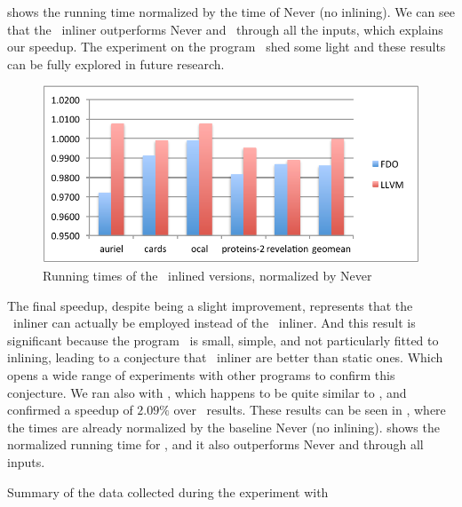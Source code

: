  shows the running time normalized by the time of Never (no inlining). We can see that the \FDI\ inliner outperforms Never and \llvm\ through all the inputs, which explains our speedup. The experiment on the program \bzip\ shed some light and these results can be fully explored in future research.

\begin{figure}
  \centering
  \includegraphics[width=1.00\linewidth]{Figures/speedupb}
  \caption{Running times of the \bzip\ inlined versions, normalized by Never}
  \label{fig:speedup}
\end{figure}

The final speedup, despite being a slight improvement, represents that the \FDI\ inliner can actually be employed instead of the \llvm\ inliner. And this result is significant because the program \bzip\ is small, simple, and not particularly fitted to inlining, leading to a conjecture that \FDI\ inliner are better than static ones. Which opens a wide range of experiments with other programs to confirm this conjecture. We ran also with \gzip, which happens to be quite similar to \bzip, and confirmed a speedup of $2.09 \%$ over \llvm\ results. These results can be seen in , where the times are already normalized by the baseline Never (no inlining).  shows the normalized running time for \gzip, and it also outperforms Never and \llvm through all inputs.

\begin{table}
  \centering
  \begin{tiny}
  
  \end{tiny}
  \caption{Summary of the data collected during the experiment with \gzip}
  \label{tab:speedupz}
\end{table}

